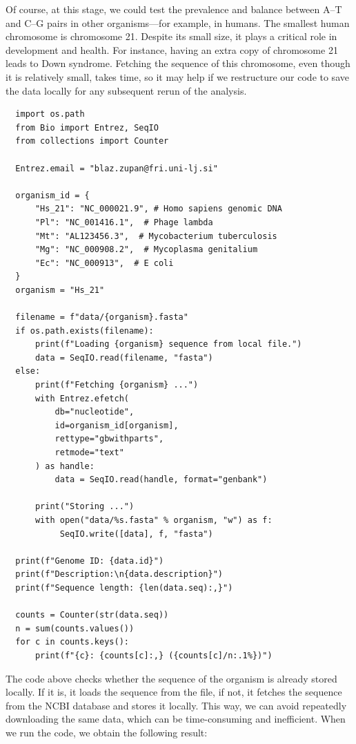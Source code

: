 Of course, at this stage, we could test the prevalence and balance between A–T and C–G pairs in other organisms—for example, in humans. The smallest human chromosome is chromosome 21. Despite its small size, it plays a critical role in development and health. For instance, having an extra copy of chromosome 21 leads to Down syndrome. Fetching the sequence of this chromosome, even though it is relatively small, takes time, so it may help if we restructure our code to save the data locally for any subsequent rerun of the analysis.

\vspace*{3mm}
\begin{lstlisting}
  import os.path
  from Bio import Entrez, SeqIO
  from collections import Counter
  
  Entrez.email = "blaz.zupan@fri.uni-lj.si"
  
  organism_id = {
      "Hs_21": "NC_000021.9", # Homo sapiens genomic DNA
      "Pl": "NC_001416.1",  # Phage lambda
      "Mt": "AL123456.3",  # Mycobacterium tuberculosis
      "Mg": "NC_000908.2",  # Mycoplasma genitalium
      "Ec": "NC_000913",  # E coli
  }
  organism = "Hs_21"
  
  filename = f"data/{organism}.fasta"
  if os.path.exists(filename):
      print(f"Loading {organism} sequence from local file.")
      data = SeqIO.read(filename, "fasta")
  else:
      print(f"Fetching {organism} ...")
      with Entrez.efetch(
          db="nucleotide",
          id=organism_id[organism],
          rettype="gbwithparts",
          retmode="text"
      ) as handle:
          data = SeqIO.read(handle, format="genbank")
  
      print("Storing ...")
      with open("data/%s.fasta" % organism, "w") as f:
           SeqIO.write([data], f, "fasta")
  
  print(f"Genome ID: {data.id}")
  print(f"Description:\n{data.description}")
  print(f"Sequence length: {len(data.seq):,}")
  
  counts = Counter(str(data.seq))
  n = sum(counts.values())
  for c in counts.keys():
      print(f"{c}: {counts[c]:,} ({counts[c]/n:.1%})")
\end{lstlisting}

The code above checks whether the sequence of the organism is already stored locally. If it is, it loads the sequence from the file, if not, it fetches the sequence from the NCBI database and stores it locally. This way, we can avoid repeatedly downloading the same data, which can be time-consuming and inefficient. When we run the code, we obtain the following result:

